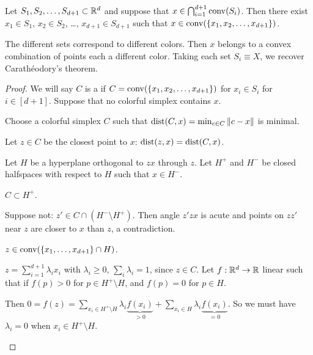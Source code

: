 \begin{theorem}
Let $S_1,S_2,\dotsc,S_{d+1}\subset \mathbb{R}^d$ and suppose that $x\in \bigcap_{i=1}^{d+1} \operatorname{conv}(S_i)$. Then there exist $x_1\in S_1$, $x_2\in S_2$, \ldots, $x_{d+1}\in S_{d+1}$ such that $x\in \operatorname{conv}(\{x_1,x_2,\dotsc,x_{d+1}\})$.
\end{theorem}
\begin{remark}
The different sets correspond to different colors. Then $x$ belongs to a convex combination of points each a different color. Taking each set $S_i \equiv X$, we recover Carath\'eodory's theorem.
\end{remark}
\begin{proof}	
We will say $C$ is a  if $C = \operatorname{conv}(\{ x_1,x_2,\dotsc,x_{d+1} \})$ for $x_i\in S_i$ for $i\in[d+1]$. Suppose that no colorful simplex contains $x$.

Choose a colorful simplex $C$ such that $\operatorname{dist}(C,x) = \min_{c\in C} \|c-x\|$ is minimal.

Let $z\in C$ be the closest point to $x$: $\operatorname{dist}(z,x) = \operatorname{dist}(C,x)$.


Let $H$ be a hyperplane orthogonal to $zx$ through $z$. Let $H^+$ and $H^-$ be closed halfspaces with respect to $H$ such that $x\in H^-$.

\begin{claim}
$C\subset H^+$.
\end{claim}
\begin{subproof}	
Suppose not: $z' \in C\cap (H^- \setminus H^+)$. Then angle $z' z x$ is acute and points on $zz'$ near $z$ are closer to $x$ than $z$, a contradiction.
\end{subproof}

\begin{claim}
$z\in \operatorname{conv}(\{x_1,\dotsc,x_{d+1}\}\cap H)$.
\end{claim}
\begin{subproof}	
$z = \sum_{i=1}^{d+1} \lambda_i x_i$ with $\lambda_i\geq 0$, $\sum_i \lambda_i =1$, since $z\in C$. Let $f: \mathbb{R}^d \to \mathbb{R}$ linear such that if $f(p)> 0$ for $p\in H^+\setminus H$, and $f(p) = 0$ for $p\in H$. 

Then $0 = f(z) = \sum_{x_i \in H^+ \setminus H} \lambda_i \underbrace{f(x_i)}_{>0} + \sum_{x_i \in H} \lambda_i \underbrace{f(x_i)}_{=0}$. So we must have $\lambda_i=0$ when $x_i \in H^+ \setminus H$.
\end{subproof}


\end{proof}
